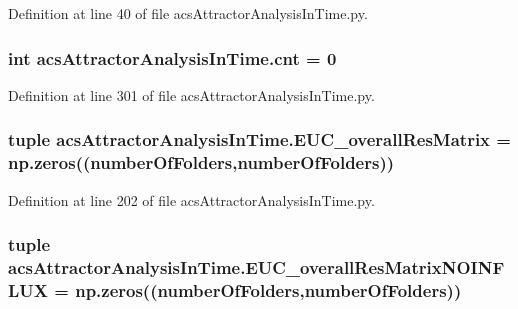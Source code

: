 Definition at line 40 of file acs\-Attractor\-Analysis\-In\-Time.\-py.

\hypertarget{a00092_aabada0bdbcd7fb71d37a9310d32f0a28}{
\subsubsection[{cnt}]{\setlength{\rightskip}{0pt plus 5cm}int acs\-Attractor\-Analysis\-In\-Time.\-cnt = 0}}\label{a00092_aabada0bdbcd7fb71d37a9310d32f0a28}


Definition at line 301 of file acs\-Attractor\-Analysis\-In\-Time.\-py.

\hypertarget{a00092_a63ee1925f76a40d04495e9b35c0973d2}{
\subsubsection[{E\-U\-C\-\_\-overall\-Res\-Matrix}]{\setlength{\rightskip}{0pt plus 5cm}tuple acs\-Attractor\-Analysis\-In\-Time.\-E\-U\-C\-\_\-overall\-Res\-Matrix = np.\-zeros(({\bf number\-Of\-Folders},{\bf number\-Of\-Folders}))}}\label{a00092_a63ee1925f76a40d04495e9b35c0973d2}


Definition at line 202 of file acs\-Attractor\-Analysis\-In\-Time.\-py.

\hypertarget{a00092_a4f2ecc559d2c5d79bb138a2e8ced8127}{
\subsubsection[{E\-U\-C\-\_\-overall\-Res\-Matrix\-N\-O\-I\-N\-F\-L\-U\-X}]{\setlength{\rightskip}{0pt plus 5cm}tuple acs\-Attractor\-Analysis\-In\-Time.\-E\-U\-C\-\_\-overall\-Res\-Matrix\-N\-O\-I\-N\-F\-L\-U\-X = np.\-zeros(({\bf number\-Of\-Folders},{\bf number\-Of\-Folders}))}}\label{a00092_a4f2ecc559d2c5d79bb138a2e8ced8127}



